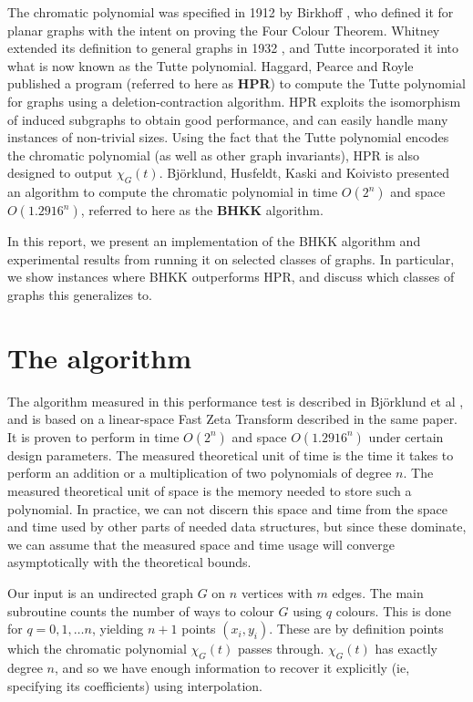 \documentclass[a4paper]{article}
\begin{document}
The chromatic polynomial was specified in 1912 by Birkhoff \cite{birkhoff}, who defined it for planar graphs with the intent on proving the Four Colour Theorem. Whitney extended its definition to general graphs in 1932 \cite{whitney}, and Tutte incorporated it into what is now known as the Tutte polynomial.
Haggard, Pearce and Royle \cite{haggard} published a program (referred to here as \textbf{HPR}) to compute the Tutte polynomial for graphs using a deletion-contraction algorithm. HPR exploits the isomorphism of induced subgraphs to obtain good performance, and can easily handle many instances of non-trivial sizes. Using the fact that the Tutte polynomial encodes the chromatic polynomial (as well as other graph invariants), HPR is also designed to output $\chi_G(t)$. 
Björklund, Husfeldt, Kaski and Koivisto presented an algorithm to compute the chromatic polynomial in time $O(2^n)$ and space $O(1.2916^n)$, referred to here as the \textbf{BHKK} algorithm. 

In this report, we present an implementation of the BHKK algorithm and experimental results from running it on selected classes of graphs. In particular, we show instances where BHKK outperforms HPR, and discuss which classes of graphs this generalizes to.


\section{The algorithm}
The algorithm measured in this performance test is described in Björklund et al \cite{cov_pack}, and is based on a linear-space Fast Zeta Transform described in the same paper. It is proven to perform in time $O(2^n)$ and space $O(1.2916^n)$ under certain design parameters. The measured theoretical unit of time is the time it takes to perform an addition or a multiplication of two polynomials of degree $n$. The measured theoretical unit of space is the memory needed to store such a polynomial. In practice, we can not discern this space and time from the space and time used by other parts of needed data structures, but since these dominate, we can assume that the measured space and time usage will converge asymptotically with the theoretical bounds.

Our input is an undirected graph $G$ on $n$ vertices with $m$ edges\footnotemark. The main subroutine counts the number of ways to colour $G$ using $q$ colours. This is done for $q = 0, 1, \ldots n$, yielding $n + 1$ points $(x_i, y_i)$. These are by definition points which the chromatic polynomial $\chi_G(t)$ passes through. $\chi_G(t)$ has exactly degree $n$, and so we have enough information to recover it explicitly (ie, specifying its coefficients) using interpolation.
\end{document}
